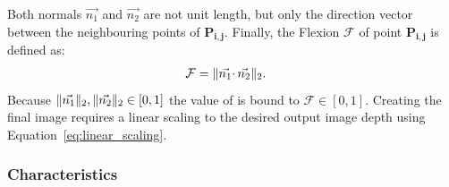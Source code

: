 Both normals $\vec{n_1}$ and $\vec{n_2}$ are not unit length, but only the direction vector between the neighbouring points of $\mathbf{P_{i,j}}$.
Finally, the Flexion $\mathcal{F}$ of point $\mathbf{P_{i,j}}$ is defined as:
\begin{align}
    \mathcal{F} &= \lVert\vec{n_1} \cdotp \vec{n_2}\rVert_{2}\text{.}
\end{align}
Because $\lVert\vec{n_1}\rVert_{2},\lVert\vec{n_2}\rVert_{2} \in [0,1]$ the value of is bound to $\mathcal{F} \in [0, 1]$.
Creating the final image requires a linear scaling to the desired output image depth using Equation~\ref{eq:linear_scaling}.

\subsubsection*{Characteristics}

